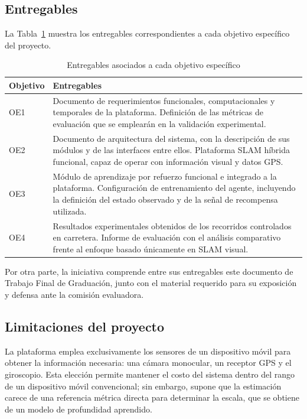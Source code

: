 \subsection{Entregables}

La Tabla~\ref{tab:entregables} muestra los entregables correspondientes a cada objetivo específico del proyecto.
\begin{table}[H]
\centering
\caption{Entregables asociados a cada objetivo específico}
\label{tab:entregables}
\begin{tabularx}{\textwidth}{@{}lX@{}}
\toprule
\textbf{Objetivo} & \textbf{Entregables} \\
\midrule
OE1 & Documento de requerimientos funcionales, computacionales y temporales de la plataforma. Definición de las métricas de evaluación que se emplearán en la validación experimental. \\
\addlinespace
OE2 & Documento de arquitectura del sistema, con la descripción de sus módulos y de las interfaces entre ellos. Plataforma SLAM híbrida funcional, capaz de operar con información visual y datos GPS. \\
\addlinespace
OE3 & Módulo de aprendizaje por refuerzo funcional e integrado a la plataforma. Configuración de entrenamiento del agente, incluyendo la definición del estado observado y de la señal de recompensa utilizada. \\
\addlinespace
OE4 & Resultados experimentales obtenidos de los recorridos controlados en carretera. Informe de evaluación con el análisis comparativo frente al enfoque basado únicamente en SLAM visual. \\
\bottomrule
\end{tabularx}
\end{table}

Por otra parte, la iniciativa comprende entre sus entregables este documento de Trabajo Final de Graduación, junto con el material requerido para su exposición y defensa ante la comisión evaluadora.

\subsection{Limitaciones del proyecto}

La plataforma emplea exclusivamente los sensores de un dispositivo móvil para obtener la información necesaria: una cámara monocular, un receptor GPS y el giroscopio.
Esta elección permite mantener el costo del sistema dentro del rango de un dispositivo móvil convencional; sin embargo, supone que la estimación carece de una referencia métrica directa para determinar la escala, que se obtiene de un modelo de profundidad aprendido.

